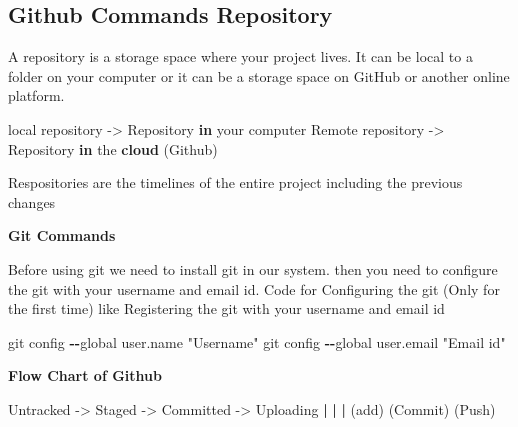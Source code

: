 \documentclass[
]{article}
\newenvironment{Shaded}{\begin{snugshade}}{\end{snugshade}}
\newcommand{\ControlFlowTok}[1]{\textcolor[rgb]{0.13,0.29,0.53}{\textbf{#1}}}
\newcommand{\ErrorTok}[1]{\textcolor[rgb]{0.64,0.00,0.00}{\textbf{#1}}}
\newcommand{\FunctionTok}[1]{\textcolor[rgb]{0.13,0.29,0.53}{\textbf{#1}}}
\newcommand{\NormalTok}[1]{#1}
\newcommand{\OtherTok}[1]{\textcolor[rgb]{0.56,0.35,0.01}{#1}}
\newcommand{\SpecialCharTok}[1]{\textcolor[rgb]{0.81,0.36,0.00}{\textbf{#1}}}
\newcommand{\StringTok}[1]{\textcolor[rgb]{0.31,0.60,0.02}{#1}}
\begin{document}
\newpage

\subsection{Github Commands
Repository}\label{github-commands-repository}

A repository is a storage space where your project lives. It can be
local to a folder on your computer or it can be a storage space on
GitHub or another online platform.

\begin{Shaded}
\begin{Highlighting}[]
\NormalTok{local repository }\OtherTok{{-}\textgreater{}}\NormalTok{ Repository }\ControlFlowTok{in}\NormalTok{ your computer}
\NormalTok{Remote repository }\OtherTok{{-}\textgreater{}}\NormalTok{ Repository }\ControlFlowTok{in}\NormalTok{ the }\FunctionTok{cloud}\NormalTok{ (Github)}
\end{Highlighting}
\end{Shaded}

Respositories are the timelines of the entire project including the
previous changes

\textbf{Git Commands}

Before using git we need to install git in our system. then you need to
configure the git with your username and email id. Code for Configuring
the git (Only for the first time) like Registering the git with your
username and email id

\begin{Shaded}
\begin{Highlighting}[]
\NormalTok{git config }\SpecialCharTok{{-}{-}}\NormalTok{global user.name }\StringTok{"Username"}
\NormalTok{git config }\SpecialCharTok{{-}{-}}\NormalTok{global user.email }\StringTok{"Email id"}
\end{Highlighting}
\end{Shaded}

\textbf{Flow Chart of Github}

\begin{Shaded}
\begin{Highlighting}[]
\NormalTok{Untracked }\OtherTok{{-}\textgreater{}}\NormalTok{ Staged }\OtherTok{{-}\textgreater{}}\NormalTok{ Committed }\OtherTok{{-}\textgreater{}}\NormalTok{ Uploading}
          \SpecialCharTok{|}         \ErrorTok{|}            \ErrorTok{|}
\NormalTok{        (add)    (Commit)      (Push)}
\end{Highlighting}
\end{Shaded}
\end{document}
